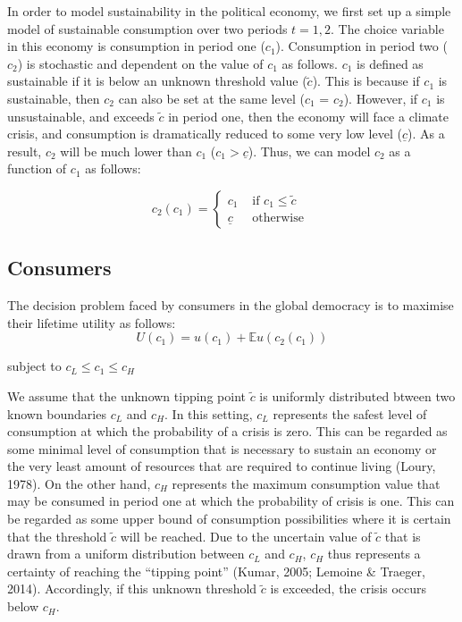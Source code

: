 \documentclass[11pt,preprint, authoryear]{elsarticle}
\numberwithin{equation}{section}
\numberwithin{figure}{section}
\numberwithin{table}{section}
\begin{document}
In order to model sustainability in the political economy, we first set
up a simple model of sustainable consumption over two periods
\(t = 1, 2\). The choice variable in this economy is consumption in
period one (\(c_1\)). Consumption in period two (\(c_2\)) is stochastic
and dependent on the value of \(c_1\) as follows. \(c_1\) is defined as
sustainable if it is below an unknown threshold value (\(\tilde{c}\)).
This is because if \(c_1\) is sustainable, then \(c_2\) can also be set
at the same level (\(c_1\) = \(c_2\)). However, if \(c_1\) is
unsustainable, and exceeds \(\tilde{c}\) in period one, then the economy
will face a climate crisis, and consumption is dramatically reduced to
some very low level (\(\underline{c}\)). As a result, \(c_2\) will be
much lower than \(c_1\) (\(c_1> \underline{c}\)). Thus, we can model
\(c_2\) as a function of \(c_1\) as follows:

\[
c_2\left(c_1\right)= \begin{cases}c_1 & \text { if } c_1 \leq \tilde{c} \\ \underline{c} & \text { otherwise }\end{cases}
\]

\hypertarget{consumers}{%
\subsection*{Consumers}\label{consumers}}

The decision problem faced by consumers in the global democracy is to
maximise their lifetime utility as follows: \[
U\left(c_1\right)=u\left(c_1\right)+\mathbb{E} u\left(c_2\left(c_1\right)\right)
\]

\begin{center}
subject to $c_L \leq c_1 \leq c_H$
\end{center}

We assume that the unknown tipping point \(\tilde{c}\) is uniformly
distributed btween two known boundaries \(c_L\) and \(c_H\). In this
setting, \(c_L\) represents the safest level of consumption at which the
probability of a crisis is zero. This can be regarded as some minimal
level of consumption that is necessary to sustain an economy or the very
least amount of resources that are required to continue living (Loury,
1978). On the other hand, \(c_H\) represents the maximum consumption
value that may be consumed in period one at which the probability of
crisis is one. This can be regarded as some upper bound of consumption
possibilities where it is certain that the threshold \(\tilde{c}\) will
be reached. Due to the uncertain value of \(\tilde{c}\) that is drawn
from a uniform distribution between \(c_L\) and \(c_H\), \(c_H\) thus
represents a certainty of reaching the ``tipping point'' (Kumar, 2005;
Lemoine \& Traeger, 2014). Accordingly, if this unknown threshold
\(\tilde{c}\) is exceeded, the crisis occurs below \(c_H\).
\end{document}
